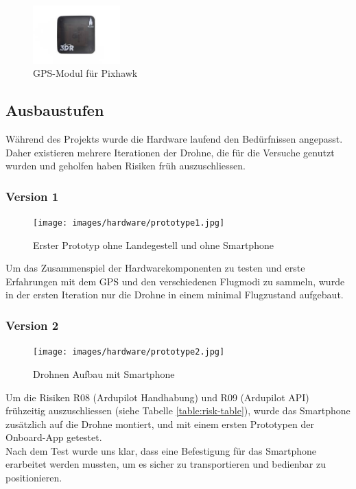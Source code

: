 \begin{figure}[h]
\centering
\includegraphics[width=0.3\textwidth] {images/hardware/gps-module.jpg} 
\caption{GPS-Modul für Pixhawk}
\label{fig:gps-module}
\end{figure}

\subsection{Ausbaustufen}

Während des Projekts wurde die Hardware laufend den Bedürfnissen angepasst. Daher existieren mehrere Iterationen der Drohne, die für die Versuche genutzt wurden und geholfen haben Risiken früh auszuschliessen.

\subsubsection{Version 1}

\begin{figure}[H]
\centering
\texttt{[image: images/hardware/prototype1.jpg]}
\caption{Erster Prototyp ohne Landegestell und ohne Smartphone}
\label{fig:prototyp-1}
\end{figure}

Um das Zusammenspiel der Hardwarekomponenten zu testen und erste Erfahrungen mit dem GPS und den verschiedenen Flugmodi zu sammeln, wurde in der ersten Iteration nur die Drohne in einem minimal Flugzustand aufgebaut.

\subsubsection{Version 2}

\begin{figure}[H]
\centering
\texttt{[image: images/hardware/prototype2.jpg]}
\caption{Drohnen Aufbau mit Smartphone}
\label{fig:prototyp-2}
\end{figure}

Um die Risiken R08 (Ardupilot Handhabung) und R09 (Ardupilot API) frühzeitig auszuschliessen (siehe Tabelle \ref{table:risk-table}), wurde das Smartphone zusätzlich auf die Drohne montiert, und mit einem ersten Prototypen der Onboard-App getestet. \\
Nach dem Test wurde uns klar, dass eine Befestigung für das Smartphone erarbeitet werden mussten, um es sicher zu transportieren und bedienbar zu positionieren.

